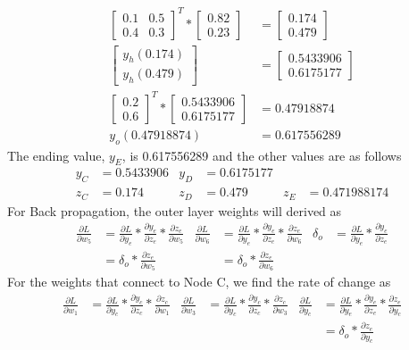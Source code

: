 \documentclass[12pt,english]{article}
\begin{document}
\begin{align*}
\begin{bmatrix} 0.1 & 0.5 \\ 0.4 & 0.3 \end{bmatrix}^T * \begin{bmatrix} 0.82 \\ 0.23 \end{bmatrix}  &= \begin{bmatrix} 0.174 \\ 0.479 \end{bmatrix} \\
\begin{bmatrix} y_h(0.174) \\ y_h(0.479) \end{bmatrix} &= \begin{bmatrix} 0.5433906 \\ 0.6175177 \end{bmatrix} \\
\begin{bmatrix} 0.2 \\ 0.6 \end{bmatrix}^T * \begin{bmatrix} 0.5433906 \\ 0.6175177 \end{bmatrix} &=0.47918874\\
y_o(0.47918874) &= 0.617556289
\end{align*}
The ending value, $y_E$, is 0.617556289 and the other values are as follows\\
\begin{align*}
y_C &=0.5433906 & y_D&=0.6175177 \\
 z_C &=0.174 & z_D&=0.479 & z_E&=0.471988174
\end{align*}
For Back propagation, the outer layer weights will derived as
\begin{align*}
\frac{\partial L}{\partial w_5} &=\frac{\partial L}{\partial y_e} * \frac{\partial y_e}{\partial z_e} * \frac{\partial z_e}{\partial w_5} &
\frac{\partial L}{\partial w_6} &=\frac{\partial L}{\partial y_e} * \frac{\partial y_e}{\partial z_e} * \frac{\partial z_e}{\partial w_6} &
\delta_o &= \frac{\partial L}{\partial y_e} * \frac{\partial y_e}{\partial z_e}\\
&= \delta_o * \frac{\partial z_e}{\partial w_5} &
&= \delta_o * \frac{\partial z_e}{\partial w_6} &
\end{align*}
 For the weights that connect to Node C, we find the rate of change as
\begin{align*}
\frac{\partial L}{\partial w_1} &=\frac{\partial L}{\partial y_c} * \frac{\partial y_c}{\partial z_c} * \frac{\partial z_c}{\partial w_1} &
\frac{\partial L}{\partial w_3} &=\frac{\partial L}{\partial y_c} * \frac{\partial y_c}{\partial z_c} * \frac{\partial z_c}{\partial w_3} &
 \frac{\partial L}{\partial y_c}  &= \frac{\partial L}{\partial y_e} * \frac{\partial y_e}{\partial z_e} * \frac{\partial z_e}{\partial y_c}\\
& &&&   &= \delta_o * \frac{\partial z_e}{\partial y_c} 
\end{align*}
\end{document}

